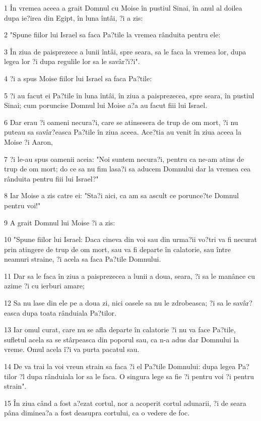 \par 1 În vremea aceea a grait Domnul cu Moise în pustiul Sinai, în anul al doilea dupa ie?irea din Egipt, în luna întâi, ?i a zis:
\par 2 "Spune fiilor lui Israel sa faca Pa?tile la vremea rânduita pentru ele:
\par 3 În ziua de paisprezece a lunii întâi, spre seara, sa le faca la vremea lor, dupa legea lor ?i dupa regulile lor sa le savâr?i?i".
\par 4 ?i a spus Moise fiilor lui Israel sa faca Pa?tile:
\par 5 ?i au facut ei Pa?tile în luna întâi, în ziua a paisprezecea, spre seara, în pustiul Sinai; cum poruncise Domnul lui Moise a?a au facut fiii lui Israel.
\par 6 Dar erau ?i oameni necura?i, care se atinsesera de trup de om mort, ?i nu puteau sa savâr?easca Pa?tile în ziua aceea. Ace?tia au venit în ziua aceea la Moise ?i Aaron,
\par 7 ?i le-au spus oamenii aceia: "Noi suntem necura?i, pentru ca ne-am atins de trup de om mort; do ce sa nu fim lasa?i sa aducem Domnului dar la vremea cea rânduita pentru fiii lui Israel?"
\par 8 Iar Moise a zis catre ei: "Sta?i aici, ca am sa ascult ce porunce?te Domnul pentru voi!"
\par 9 A grait Domnul lui Moise ?i a zis:
\par 10 "Spune fiilor lui Israel: Daca cineva din voi sau din urma?ii vo?tri va fi necurat prin atingere de trup de om mort, sau va fi departe în calatorie, sau între neamuri straine, ?i acela sa faca Pa?tile Domnului.
\par 11 Dar sa le faca în ziua a paisprezecea a lunii a doua, seara, ?i sa le manânce cu azime ?i cu ierburi amare;
\par 12 Sa nu lase din ele pe a doua zi, nici oasele sa nu le zdrobeasca; ?i sa le savâr?easca dupa toata rânduiala Pa?tilor.
\par 13 Iar omul curat, care nu se afla departe în calatorie ?i nu va face Pa?tile, sufletul acela sa se stârpeasca din poporul sau, ca n-a adus dar Domnului la vreme. Omul acela î?i va purta pacatul sau.
\par 14 De va trai la voi vreun strain sa faca ?i el Pa?tile Domnului: dupa legea Pa?tilor ?l dupa rânduiala lor sa le faca. O singura lege sa fie ?i pentru voi ?i pentru strain".
\par 15 În ziua când a fost a?ezat cortul, nor a acoperit cortul adunarii, ?i de seara pâna diminea?a a fost deasupra cortului, ca o vedere de foc.
